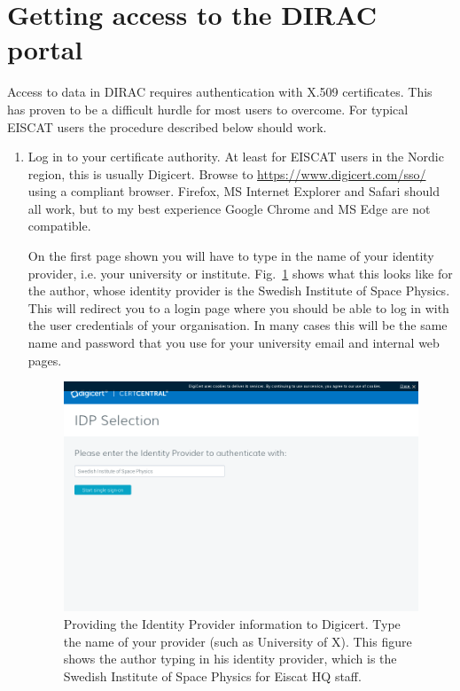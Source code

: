 \documentclass[a4paper]{article}
\begin{document}
\section{Getting access to the DIRAC portal}
\label{sec:access}

Access to data in DIRAC requires authentication with X.509
certificates. This has proven to be a difficult hurdle for most users
to overcome. For typical EISCAT users the procedure described below
should work.

\begin{enumerate}


\item Log in to your certificate authority. At least for EISCAT users
  in the Nordic region, this is usually Digicert. Browse to
  \url{https://www.digicert.com/sso/} using a compliant
  browser. Firefox, MS Internet Explorer and Safari should all work,
  but to my best experience Google Chrome and MS Edge are not compatible. 

  On the first page shown you will have to type in the name of your
  identity provider, i.e. your university or
  institute. Fig.~\ref{fig:idp} shows what this looks like for the
  author, whose identity provider is the Swedish Institute of Space
  Physics. This will redirect you to a login page where you should be
  able to log in with the user credentials of your organisation. In
  many cases this will be the same name and password that you use for
  your university email and internal web pages.

  \begin{figure}[htb]
    \centering
    \includegraphics[width=1.0\linewidth]{idp-provider}
    \caption{Providing the Identity Provider information to Digicert. Type the name of your provider (such as University of X). This figure shows the author typing in his identity provider, which is the Swedish Institute of Space Physics for Eiscat HQ staff.}
    \label{fig:idp}
  \end{figure}


\end{enumerate}
\end{document}
